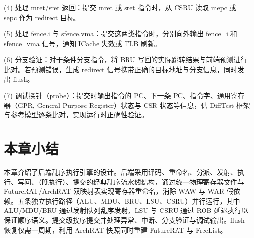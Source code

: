 (4) 处理 mret/sret 返回：提交 mret 或 sret 指令时，从 CSRU 读取 mepc 或 sepc 作为 redirect 目标。

(5) 处理 fence.i 与 sfence.vma：提交这两类指令时，分别向外输出 fence\_i 和 sfence\_vma 信号，通知 ICache 失效或 TLB 刷新。

(6) 分支验证：对于条件分支指令，将 BRU 写回的实际跳转结果与前端预测进行比对。若预测错误，生成 redirect 信号携带正确的目标地址与分支信息，同时发出 flush。

(7) 调试探针（probe）：提交时输出指令的 PC、下一条 PC、指令字、通用寄存器（GPR, General Purpose Register）状态与 CSR 状态等信息，供 DiffTest 框架与参考模型逐条比对，实现运行时正确性验证。

\section{本章小结}

本章介绍了后端乱序执行引擎的设计。后端采用译码、重命名、分派、发射、执行、写回、（晚执行）、提交的经典乱序流水线结构，通过统一物理寄存器文件与 FutureRAT/ArchRAT 双映射表实现寄存器重命名，消除 WAW 与 WAR 假依赖。五条独立执行路径（ALU、MDU、BRU、LSU、CSRU）并行运行，其中 ALU/MDU/BRU 通过发射队列乱序发射，LSU 与 CSRU 通过 ROB 延迟执行以保证顺序语义。提交级按序提交并处理异常、中断、分支验证与调试输出。flush 恢复仅需一周期，利用 ArchRAT 快照同时重建 FutureRAT 与 FreeList。
